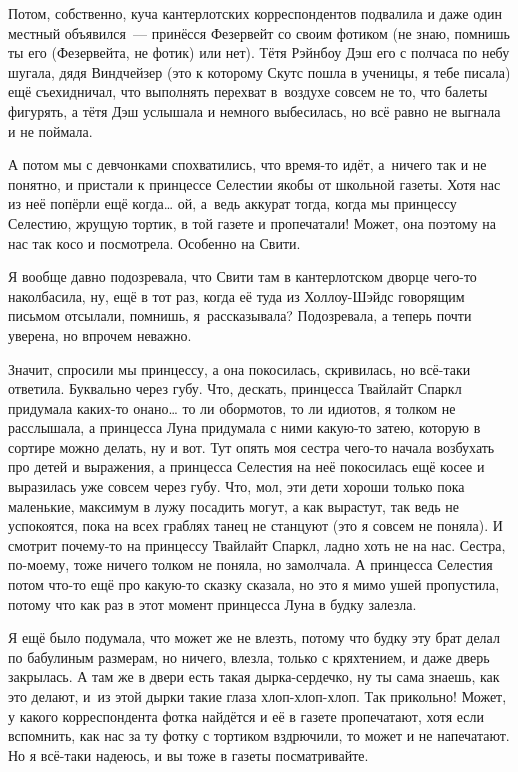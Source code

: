 \documentclass[fontsize=11pt,a5paper,titlepage=firstcover]{scrbook}
\begin{document}
Потом, собственно, куча кантерлотских корреспондентов подвалила и даже один местный объявился~--- принёсся Фезервейт со своим фотиком (не знаю, помнишь ты его (Фезервейта, не фотик) или нет). Тётя Рэйнбоу Дэш его с полчаса по небу шугала, дядя Виндчейзер (это к которому Скутс пошла в ученицы, я тебе писала) ещё съехидничал, что выполнять перехват в~воздухе совсем не то, что балеты фигурять, а тётя Дэш услышала и немного выбесилась, но всё равно не выгнала и не поймала.

А потом мы с девчонками спохватились, что время-то идёт, а~ничего так и не понятно, и пристали к принцессе Селестии якобы от школьной газеты. Хотя нас из неё попёрли ещё когда{\ldots} ой, а~ведь аккурат тогда, когда мы принцессу Селестию, жрущую тортик, в той газете и пропечатали! Может, она поэтому на нас так косо и посмотрела. Особенно на Свити.

Я вообще давно подозревала, что Свити там в кантерлотском дворце чего-то наколбасила, ну, ещё в тот раз, когда её туда из Холлоу-Шэйдс говорящим письмом отсылали, помнишь, я~рассказывала? Подозревала, а теперь почти уверена, но впрочем неважно.

Значит, спросили мы принцессу, а она покосилась, скривилась, но всё-таки ответила. Буквально через губу. Что, дескать, принцесса Твайлайт Спаркл придумала каких-то онано{\ldots} то ли обормотов, то ли идиотов, я толком не расслышала, а принцесса Луна придумала с ними какую-то затею, которую в сортире можно делать, ну и вот. Тут опять моя сестра чего-то начала возбухать про детей и выражения, а принцесса Селестия на неё покосилась ещё косее и выразилась уже совсем через губу. Что, мол, эти дети хороши только пока маленькие, максимум в лужу посадить могут, а как вырастут, так ведь не успокоятся, пока на всех граблях танец не станцуют (это я совсем не поняла). И смотрит почему-то на принцессу Твайлайт Спаркл, ладно хоть не на нас. Сестра, по-моему, тоже ничего толком не поняла, но замолчала. А принцесса Селестия потом что-то ещё про какую-то сказку сказала, но это я мимо ушей пропустила, потому что как раз в этот момент принцесса Луна в будку залезла.

Я ещё было подумала, что может же не влезть, потому что будку эту брат делал по бабулиным размерам, но ничего, влезла, только с кряхтением, и даже дверь закрылась. А там же в двери есть такая дырка-сердечко, ну ты сама знаешь, как это делают, и~из этой дырки такие глаза хлоп-хлоп-хлоп. Так прикольно! Может, у какого корреспондента фотка найдётся и её в газете пропечатают, хотя если вспомнить, как нас за ту фотку с тортиком вздрючили, то может и не напечатают. Но я всё-таки надеюсь, и вы тоже в газеты посматривайте.
\end{document}
